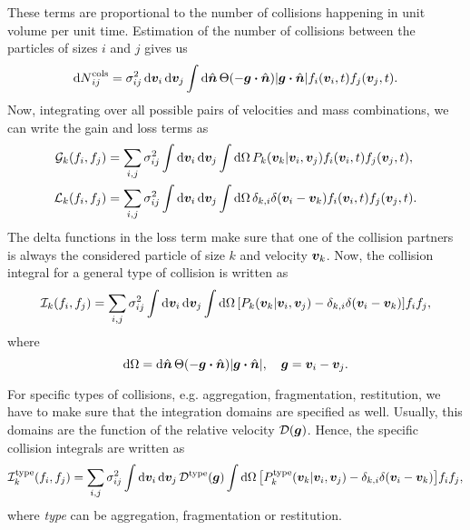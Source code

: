 \documentclass[aps,prl,preprint,groupedaddress,10pt]{revtex4-2}
\begin{document}
These terms are proportional to the number of collisions happening in unit volume per unit
time. Estimation of the number of collisions between the particles of sizes $i$ and $j$
gives us
\begin{equation}
    \utx{\dd{N}}{cols}_{ij}=\sigma_{ij}^2\dd{\bv_i}\dd{\bv_j}\int\dd{\bn}
    \Theta\pqty{-\bg\vdot\bn}\abs{\bg\vdot\bn}f_i\pqty{\bv_i,t}f_j\pqty{\bv_j,t}.
\end{equation}
Now, integrating over all possible pairs of velocities and mass combinations, we can write
the gain and loss terms as
\begin{equation}
    \begin{split}
        \mathcal{G}_k\pqty{f_i,f_j}&=\sum_{i,j}\sigma_{ij}^2\int\dd{\bv_i}\dd{\bv_j}
        \int\dd{\Omega}P_k\pqty{\bv_k\vert\bv_i,\bv_j}f_i\pqty{\bv_i,t}f_j\pqty{\bv_j,t},\\
        \mathcal{L}_k\pqty{f_i,f_j}&=\sum_{i,j}\sigma_{ij}^2\int\dd{\bv_i}\dd{\bv_j}
        \int\dd{\Omega}\delta_{k,i}\delta\pqty{\bv_i-\bv_k}f_i\pqty{\bv_i,t}f_j\pqty{\bv_j,t}.
    \end{split}
\end{equation}
The delta functions in the loss term make sure that one of the collision partners is always
the considered particle of size $k$ and velocity $\vb*{v}_k$. Now, the collision integral for a
general type of collision is written as
\begin{equation}
    \mathcal{I}_k\pqty{f_i,f_j}=\sum_{i,j}\sigma_{ij}^2\int\dd{\bv_i}\dd{\bv_j}\int\dd{\Omega}
    \bqty{P_k\pqty{\bv_k\vert\bv_i,\bv_j}-\delta_{k,i}\delta\pqty{\bv_i-\bv_k}}f_if_j,
\end{equation}
where
\begin{equation}
    \dd{\Omega}=\dd{\bn}\Theta\pqty{-\bg\vdot\bn}\abs{\bg\vdot\bn},\quad\bg=\bv_i-\bv_j.
\end{equation}

For specific types of collisions, e.g. aggregation, fragmentation, restitution, we have
to make sure that the integration domains are specified as well. Usually, this domains are
the function of the relative velocity $\mathcal{D}(\vb*{g})$. Hence, the specific collision
integrals are written as
\begin{equation}
    \utx{\mathcal{I}_k}{type}\pqty{f_i,f_j}=\sum_{i,j}\sigma_{ij}^2\int\dd{\bv_i}\dd{\bv_j}
    \utx{\mathcal{D}}{type}(\bg)\int\dd{\Omega}\bqty{\utx{P_k}{type}
        \pqty{\bv_k\vert\bv_i,\bv_j}-\delta_{k,i}\delta\pqty{\bv_i-\bv_k}}f_if_j,
\end{equation}
where \emph{type} can be aggregation, fragmentation or restitution.
\end{document}
